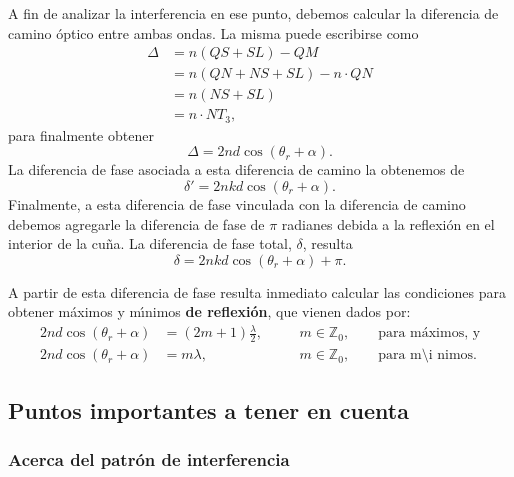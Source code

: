 \documentclass[a4paper]{article}
\newcommand{\Z}{\mathbb{Z}}
\begin{document}
A fin de analizar la interferencia en ese punto, debemos calcular la diferencia
de camino \'optico entre ambas ondas. La misma puede escribirse como
\begin{align*}
    \Delta &= n \left( QS + SL \right) - QM \\
           &= n \left( QN + NS + SL \right) - n \cdot QN \\
           &= n \left( NS + SL \right) \\
           &= n \cdot NT_3,
\end{align*}
para finalmente obtener
\begin{equation}
    \Delta = 2 n d \cos \left( \theta_r + \alpha \right).
\end{equation}
La diferencia de fase asociada a esta diferencia de camino la obtenemos de
\begin{equation}
    \delta' = 2 n k d \cos \left( \theta_r + \alpha \right).
\end{equation}
Finalmente, a esta diferencia de fase vinculada con la diferencia de camino
debemos agregarle la diferencia de fase de $\pi$ radianes debida a la 
reflexi\'on en el interior de la cu\~na. La diferencia de fase
total, $\delta$, resulta
\begin{equation}
    \delta = 2 n k d \cos \left( \theta_r + \alpha \right) + \pi.
\end{equation}

A partir de esta diferencia de fase resulta inmediato calcular las condiciones
para obtener m\'aximos y m\'\i nimos {\bf de reflexi\'on}, que vienen dados 
por: 
\begin{align}
    2 n d \cos \left( \theta_r + \alpha \right) &= \left( 2 m + 1 \right) 
    \frac{\lambda}{2}, \quad &&m \in \Z_0, \quad \quad \text{para m\'aximos, y}
    \\
    2 n d \cos \left( \theta_r + \alpha \right) &= m \lambda, \quad &&m \in 
    \Z_0, \quad \quad \text{para m\'\i nimos}.
\end{align}

\subsection{Puntos importantes a tener en cuenta}

\subsubsection{Acerca del patr\'on de interferencia}
\end{document}
